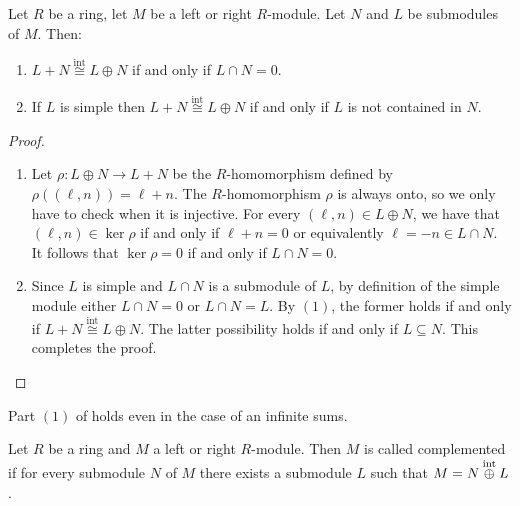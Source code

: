 \documentclass[11pt,a4paper]{article}
\begin{document}
\begin{lemma}
  \label{lem:ioplus-lemma}
  Let $R$ be a ring, let $M$ be a left or right $R$-module.
  Let $N$ and $L$ be submodules of $M$.
  Then:
  \begin{enumerate}
    \item[(1)] $L + N \overset{\text{int}}{\cong} L \oplus N$ if and only if
      $L \cap N = 0$.
    \item[(2)] If $L$ is simple then $L + N \overset{\text{int}}{\cong} L \oplus N$
      if and only if $L$ is not contained in $N$.
  \end{enumerate}
\end{lemma}
\begin{proof} \phantom{}
  \begin{enumerate}
    \item[(1)] Let $\rho \colon L \oplus N \to L + N$ be the $R$-homomorphism defined by
      $\rho((\ell,n)) = \ell + n$.
      The $R$-homomorphism $\rho$ is always onto, so we only have to check when it is
      injective.
      For every $(\ell,n) \in L \oplus N$, we have that $(\ell,n) \in \ker \rho$
      if and only if $\ell + n = 0$ or equivalently $\ell = -n \in L \cap N$.
      It follows that $\ker \rho = 0$ if and only if $L \cap N = 0$.
    \item[(2)] Since $L$ is simple and $L \cap N$ is a submodule of $L$,
      by definition of the simple module either $L \cap N = 0$
      or $L \cap N = L$.
      By $(1)$, the former holds if and only if
      $L + N \overset{\text{int}}{\cong} L \oplus N$.
      The latter possibility holds if and only if $L \subseteq N$.
      This completes the proof.
  \end{enumerate}
\end{proof}

\begin{remark}
  Part $(1)$ of  holds even in the case of an infinite
  sums.
\end{remark}

\begin{definition}
  Let $R$ be a ring and $M$ a left or right $R$-module.
  Then $M$ is called complemented if for every submodule $N$ of $M$
  there exists a submodule $L$ such that $M = N \overset{\text{int}}{\oplus} L$.
\end{definition}
\end{document}
